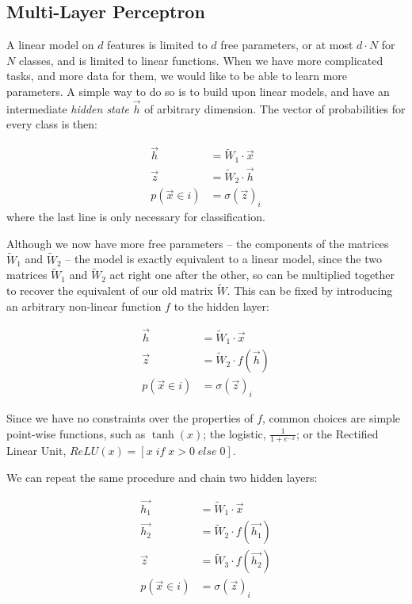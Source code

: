 \subsection{Multi-Layer Perceptron}\label{sec:mlp}
A linear model on $d$ features is limited to $d$ free parameters, or at most $d \cdot N$ for $N$ classes, and is limited to linear functions.
When we have more complicated tasks, and more data for them, we would like to be able to learn more parameters.
A simple way to do so is to build upon linear models, and have an intermediate \emph{hidden state} $\vec{h}$ of arbitrary dimension.
The vector of probabilities for every class is then:

\begin{align*}
\vec{h} &= \widetilde W_1 \cdot \vec{x} \\
\vec{z} &= \widetilde W_2 \cdot \vec{h} \\
p(\vec x \in i) &= \sigma(\vec z)_i
\end{align*}
where the last line is only necessary for classification.

Although we now have more free parameters -- the components of the matrices $\widetilde W_1$ and $\widetilde W_2$ -- the model is exactly equivalent to a linear model, since the two matrices $\widetilde W_1$ and $\widetilde W_2$ act right one after the other, so can be multiplied together to recover the equivalent of our old matrix $\widetilde W$.
This can be fixed by introducing an arbitrary non-linear function $f$ to the hidden layer:

\begin{align*}
\vec{h} &= \widetilde W_1 \cdot \vec{x} \\
\vec{z} &= \widetilde W_2 \cdot f(\vec{h}) \\
p(\vec x \in i) &= \sigma(\vec z)_i
\end{align*}

Since we have no constraints over the properties of $f$, common choices are simple point-wise functions, such as $\tanh(x)$; the logistic, $\frac{1}{1 + e^{-x}}$; or the Rectified Linear Unit, $ReLU(x)=[x \; if \; x > 0 \; else \; 0]$.

We can repeat the same procedure and chain two hidden layers:

\begin{align*}
\vec{h_1} &= \widetilde W_1 \cdot \vec{x} \\
\vec{h_2} &= \widetilde W_2 \cdot f(\vec{h_1}) \\
\vec{z} &= \widetilde W_3 \cdot f(\vec{h_2}) \\
p(\vec x \in i) &= \sigma(\vec z)_i
\end{align*}

